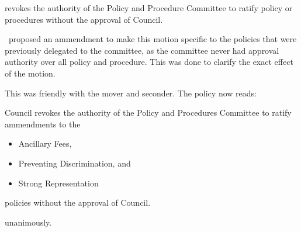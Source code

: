\begin{motion}

    \birt revokes the authority of the Policy and Procedure Committee to ratify
    policy or procedures without the approval of Council.
    \movers{\seneca}{\brian}

    \tristan\ proposed an ammendment to make this motion specific to the
    policies that were previously delegated to the committee, as the committee
    never had approval authority over all policy and procedure. This was done
    to clarify the exact effect of the motion.
    
    This was friendly with the mover and seconder. The policy now reads:

    \birt Council revokes the authority of the Policy and Procedures Committee
    to ratify ammendments to the \begin{itemize}
        \item Ancillary Fees,
        \item Preventing Discrimination, and
        \item Strong Representation
    \end{itemize} policies without the approval of Council. 

    \carries unanimously. 

\end{motion}

